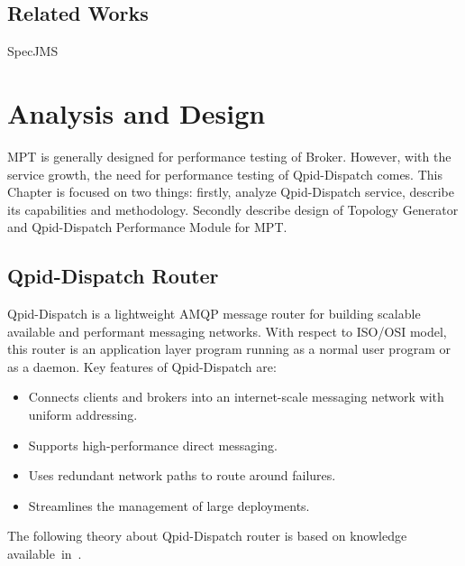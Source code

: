 
\section{Related Works}
\label{Related Works}
SpecJMS

\chapter{Analysis and Design}
\label{Analysis and Design}
MPT is generally designed for performance testing of Broker. However, with the service growth, the need for performance testing of Qpid-Dispatch comes. This Chapter is focused on two things: firstly, analyze Qpid-Dispatch service, describe its capabilities and methodology. Secondly describe design of Topology Generator and Qpid-Dispatch Performance Module for MPT.

\section{Qpid-Dispatch Router}
Qpid-Dispatch is a lightweight AMQP message router for building scalable available and performant messaging networks. With respect to ISO/OSI\footnotemark{} model, this router is an application layer program running as a normal user program or as a daemon. Key features of Qpid-Dispatch are:

\begin{itemize}
	\setlength\itemsep{0em}
	\item Connects clients and brokers into an internet-scale messaging network with uniform addressing.
	\item Supports high-performance direct messaging.
	\item Uses redundant network paths to route around failures.
	\item Streamlines the management of large deployments.
\end{itemize}
The following theory about Qpid-Dispatch router is based on knowledge available~in~\cite{RH:Interconnect}.


